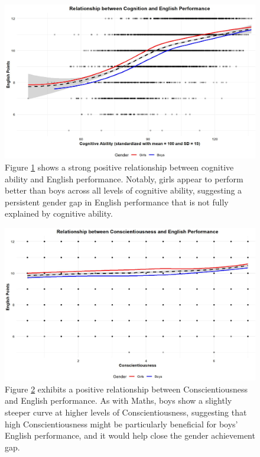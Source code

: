 \documentclass[12pt,a4paper,onecolumn]{article}
\numberwithin{equation}{section}
\begin{document}
\begin{figure}[ht] 
    \centering
    \includegraphics[width=1\linewidth]{production_function_english_cog.JPG}
    \caption{Figure \ref{fig:cog_English} shows a strong positive relationship between cognitive ability and English performance. Notably, girls appear to perform better than boys across all levels of cognitive ability, suggesting a persistent gender gap in English performance that is not fully explained by cognitive ability.}
    \label{fig:cog_English}
\end{figure}

\begin{figure}[ht] 
    \centering
    \includegraphics[width=1\linewidth]{production_function_english_cons.JPG}
    \caption{Figure \ref{fig:con_English} exhibits a positive relationship between Conscientiousness and English performance. As with Maths, boys show a slightly steeper curve at higher levels of Conscientiousness, suggesting that high Conscientiousness might be particularly beneficial for boys' English performance, and it would help close the gender achievement gap.}
    \label{fig:con_English}
\end{figure}
\end{document}
